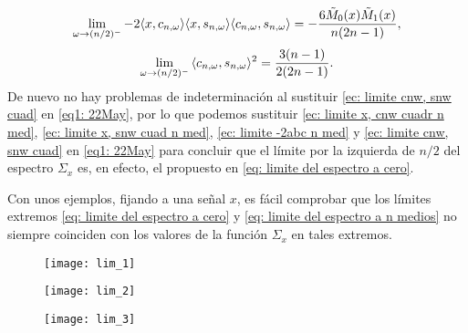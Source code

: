 \begin{equation}
\label{ec: limite -2abc n med}
\lim\limits_{\omega \rightarrow (n/2)^{-}}{
-2 \langle x, c_{n, \omega} \rangle
\langle x, s_{n, \omega} \rangle
\langle c_{n, \omega}, s_{n, \omega} \rangle
= 
- \frac{6\tilde{M}_{0}(x)\tilde{M}_{1}(x)}{n(2n-1)},
}
\end{equation}
\begin{equation}
\label{ec: limite cnw, snw cuad}
\lim\limits_{\omega \rightarrow (n/2)^{-}}{\langle
c_{n, \omega}, s_{n, \omega}
\rangle^{2} }
= \frac{3(n-1)}{2(2n-1)}.
\end{equation}
De nuevo no hay problemas de indeterminación al 
sustituir \eqref{ec: limite cnw, snw cuad} en 
\eqref{eq1: 22May}, por lo que podemos 
sustituir 
\eqref{ec: limite x, cnw cuadr n med}, 
\eqref{ec: limite x, snw cuad n med}, 
\eqref{ec: limite -2abc n med} y 
\eqref{ec: limite cnw, snw cuad} en 
\eqref{eq1: 22May} para concluir que el límite por la izquierda
de $n/2$ del espectro $\Sigma_{x}$ es, en efecto,
el propuesto
en 
\eqref{eq: limite del espectro a cero}. \\
\QEDB
\vspace{0.2cm}


Con unos ejemplos,
fijando a una señal $x$,
es fácil comprobar que los límites extremos 
\eqref{eq: limite del espectro a cero} y 
\eqref{eq: limite del espectro a n medios}
no siempre coinciden con los valores
de la función $\Sigma_{x}$ en tales extremos.



\begin{figure}[H]
	\centering
	\texttt{[image: lim\_1]} 
\end{figure}	

\begin{figure}[H]
	\centering
	\texttt{[image: lim\_2]} 
\end{figure}

\begin{figure}[H]
	\centering
	\texttt{[image: lim\_3]} 
\end{figure}

